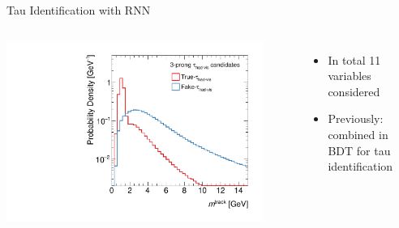 \documentclass[11pt, xcolor={dvipsnames}, aspectratio=169]{beamer}
\begin{document}
\begin{frame}{Tau Identification with RNN}
\begin{columns}[onlytextwidth]
\begin{columns}[onlytextwidth]
      \centering


      \includegraphics[width=0.9\textwidth]{tauid/invars/invars_masstrksys_3P}
    \end{columns}

    \vspace*{0.5em}

    \begin{itemize}
    \item In total 11 variables considered
    \item Previously: combined in BDT for tau identification
    \end{itemize}

  \end{columns}
\end{frame}

\end{document}
